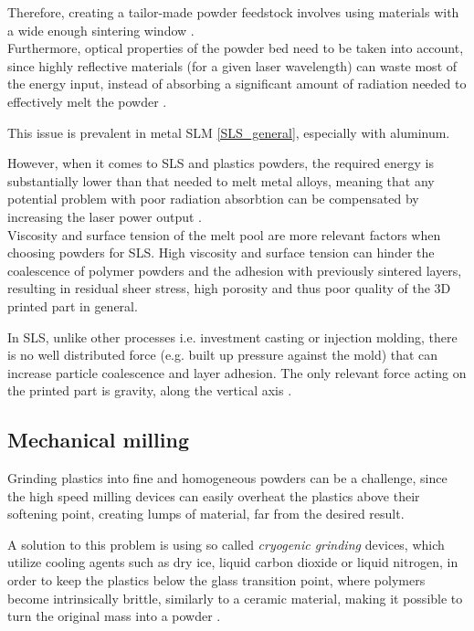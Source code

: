 \documentclass{article}
\begin{document}
    Therefore, creating a tailor-made powder feedstock involves using materials with a wide enough 
    sintering window \autocites*{DechetMaximilianA2020OtDo}{doi:10.1063/1.4918516}. \\

    Furthermore, optical properties of the powder bed need to be taken into account, since highly reflective materials (for a given 
    laser wavelength) can waste most of the energy input, instead of absorbing a significant amount of radiation needed to 
    effectively melt the powder \autocite{doi:10.1063/1.4918516}.  

    This issue is prevalent in metal SLM \ref{SLS_general}, especially with aluminum. 
    
    However, when it comes to SLS and plastics powders, the required energy is substantially lower than that needed to melt metal alloys, 
    meaning that any potential problem with poor radiation absorbtion can be compensated by increasing the 
    laser power output \autocite{doi:10.1063/1.4918516}. \\ 
    
    Viscosity and surface tension of the melt pool are more relevant factors when choosing powders for SLS. 
    High viscosity and surface tension can hinder the coalescence of polymer powders and the adhesion with previously 
    sintered layers, resulting in residual sheer stress, high porosity and thus poor quality of the 3D printed part in general. 
    
    In SLS, unlike other processes i.e. investment casting or injection molding, there is no well distributed force
    (e.g. built up pressure against the mold) that can increase particle coalescence and layer adhesion. The only relevant
    force acting on the printed part is gravity, along the vertical axis \autocite*{doi:10.1063/1.4918516}. 

    \subsection{Mechanical milling \label{Mechanical_milling}}

    Grinding plastics into fine and homogeneous powders can be a challenge, since the high speed milling devices can easily overheat the 
    plastics above their softening point, creating lumps of material, far from the desired result.
    
    A solution to this problem is using so called \textit{cryogenic grinding} devices, which utilize cooling agents such as dry ice, liquid 
    carbon dioxide or liquid nitrogen, in order to keep the plastics below the glass transition point, where polymers become intrinsically
    brittle, similarly to a ceramic material, making it possible to turn the original mass into a powder \autocites*{cryogenic_grinding_video}{Junghare_cryogenic_grinding_review}. 
\end{document}
